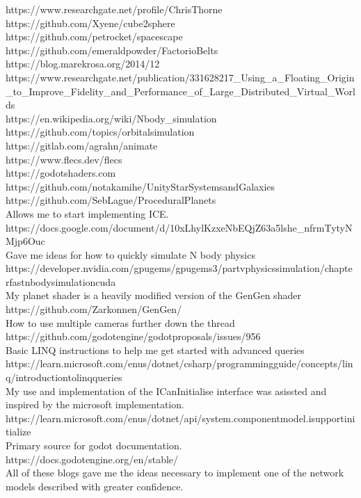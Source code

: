\documentclass[12pt, DIV=calc]{scrartcl}
\begin{document}
https://www.researchgate.net/profile/Chris\-Thorne \\
https://github.com/Xyene/cube2sphere \\
https://github.com/petrocket/spacescape \\
https://github.com/emeraldpowder/FactorioBelts \\
https://blog.marekrosa.org/2014/12 \\
https://www.researchgate.net/publication/331628217\_Using\_a\_Floating\_Origin\_to\_Improve\_Fidelity\_and\_Performance\_of\_Large\_Distributed\_Virtual\_Worlds \\
https://en.wikipedia.org/wiki/N\-body\_simulation \\
https://github.com/topics/orbital\-simulation \\
https://gitlab.com/agrahn/animate \\
https://www.flecs.dev/flecs \\
https://godotshaders.com \\
https://github.com/notakamihe/Unity\-Star\-Systems\-and\-Galaxies \\
https://github.com/SebLague/Procedural\-Planets \\
Allows me to start implementing ICE. https://docs.google.com/document/d/10xLhy\-lKzxeNbEQjZ63a5lshe\-\_nfrmTytyNMjp6Ouc \\
Gave me ideas for how to quickly simulate N body physics https://developer.nvidia.com/gpugems/gpugems3/part\-v\-physics\-simulation/chapter\-fast\-n\-body\-simulation\-cuda \\
My planet shader is a heavily modified version of the GenGen shader https://github.com/Zarkonnen/GenGen/ \\
How to use multiple cameras further down the thread https://github.com/godotengine/godot\-proposals/issues/956 \\
Basic LINQ instructions to help me get started with advanced queries https://learn.microsoft.com/en\-us/dotnet/csharp/programming\-guide/concepts/linq/introduction\-to\-linq\-queries \\
My use and implementation of the ICanInitialise interface was asissted and inspired by the microsoft implementation. \\
https://learn.microsoft.com/en\-us/dotnet/api/system.componentmodel.isupportinitialize \\
Primary source for godot documentation. https://docs.godotengine.org/en/stable/ \\
All of these blogs gave me the ideas necessary to implement one of the network models described with greater confidence. \\
\end{document}
